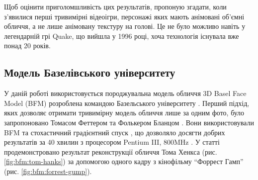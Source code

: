 Щоб оцінити приголомшливість цих результатів, пропоную згадати,
коли з'явилися перші тривимірні відеоігри,
персонажі яких мають анімовані об'ємні обличчя,
а не лише анімовану текстуру на голові.
Це не було можливо навіть у легендарній грі Quake,
що вийшла у 1996 році, хоча технологія існувала вже понад 20 років.

\subsection{Модель Базелівського університету}

У даній роботі використовується породжувальна модель обличчя
3D Basel Face Model (BFM)
розроблена командою Базельського університету
\cite{bfm09}.
Перший підхід,
яких дозволяє отримати тривимірну модель обличчя лише за одним фото,
було запропоновано Томасом Феттером та Фолькером Бланцом
\cite{blanz:vetter:1999}.
Вони використовували BFM та стохастичний градієнтний спуск \cite{sgd:1998},
що дозволяло досягти добрих результатів за 40 хвилин з процесором
Pentium III, 800MHz \cite{blanz:romdhani:vetter}.
У статті продемонстровано результат реконструкції
обличчя Тома Хенкса (рис. \ref{fig:bfm:tom-hanks})
за допомогою одного кадру з кінофільму ``Форрест Гамп''
(рис. \ref{fig:bfm:forrest-gump}).
